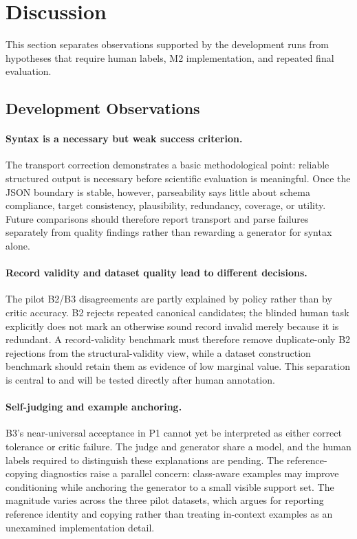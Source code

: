 \section{Discussion}
\label{sec:discussion}

This section separates observations supported by the development runs from
hypotheses that require human labels, M2 implementation, and repeated final
evaluation.

\subsection{Development Observations}

\paragraph{Syntax is a necessary but weak success criterion.}

The transport correction demonstrates a basic methodological point: reliable
structured output is necessary before scientific evaluation is meaningful.
Once the JSON boundary is stable, however, parseability says little about
schema compliance, target consistency, plausibility, redundancy, coverage, or
utility. Future comparisons should therefore report transport and parse
failures separately from quality findings rather than rewarding a generator
for syntax alone.

\paragraph{Record validity and dataset quality lead to different decisions.}

The pilot B2/B3 disagreements are partly explained by policy rather than by
critic accuracy. B2 rejects repeated canonical candidates; the blinded human
task explicitly does not mark an otherwise sound record invalid merely because
it is redundant. A record-validity benchmark must therefore remove
duplicate-only B2 rejections from the structural-validity view, while a dataset
construction benchmark should retain them as evidence of low marginal value.
This separation is central to \rcqasyn{} and will be tested directly after
human annotation.

\paragraph{Self-judging and example anchoring.}

B3's near-universal acceptance in P1 cannot yet be interpreted as either
correct tolerance or critic failure. The judge and generator share a model,
and the human labels required to distinguish these explanations are pending.
The reference-copying diagnostics raise a parallel concern: class-aware
examples may improve conditioning while anchoring the generator to a small
visible support set. The magnitude varies across the three pilot datasets,
which argues for reporting reference identity and copying rather than treating
in-context examples as an unexamined implementation detail.

